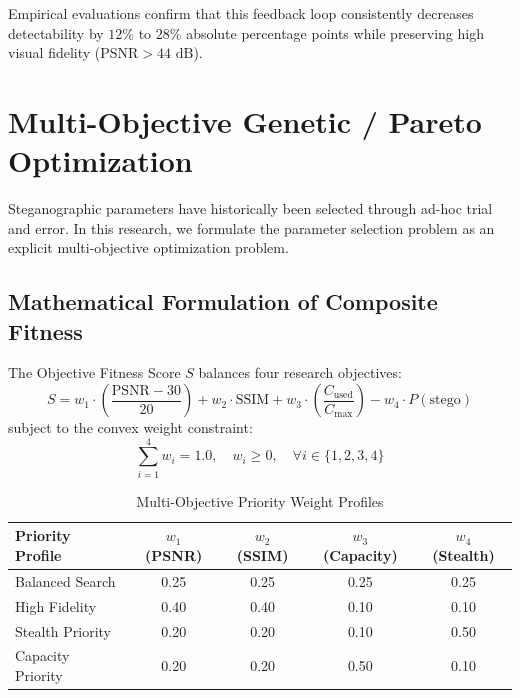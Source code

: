 \documentclass[conference]{IEEEtran}
\begin{document}
Empirical evaluations confirm that this feedback loop consistently decreases detectability by $12\%$ to $28\%$ absolute percentage points while preserving high visual fidelity ($\text{PSNR} > 44\text{ dB}$).

\section{Multi-Objective Genetic / Pareto Optimization}
Steganographic parameters have historically been selected through ad-hoc trial and error. In this research, we formulate the parameter selection problem as an explicit multi-objective optimization problem.

\subsection{Mathematical Formulation of Composite Fitness}
The Objective Fitness Score $S$ balances four research objectives:
\begin{equation}
    S = w_1 \cdot \left(\frac{\text{PSNR} - 30}{20}\right) + w_2 \cdot \text{SSIM} + w_3 \cdot \left(\frac{C_{\text{used}}}{C_{\max}}\right) - w_4 \cdot P(\text{stego})
\end{equation}
subject to the convex weight constraint:
\begin{equation}
    \sum_{i=1}^4 w_i = 1.0, \quad w_i \ge 0, \quad \forall i \in \{1, 2, 3, 4\}
\end{equation}

\begin{table}[htbp]
\caption{Multi-Objective Priority Weight Profiles}
\label{tab:weights}
\centering
\begin{tabular}{@{}lcccc@{}}
\toprule
\textbf{Priority Profile} & \textbf{$w_1$ (PSNR)} & \textbf{$w_2$ (SSIM)} & \textbf{$w_3$ (Capacity)} & \textbf{$w_4$ (Stealth)} \\
\midrule
Balanced Search    & 0.25 & 0.25 & 0.25 & 0.25 \\
High Fidelity      & 0.40 & 0.40 & 0.10 & 0.10 \\
Stealth Priority   & 0.20 & 0.20 & 0.10 & 0.50 \\
Capacity Priority  & 0.20 & 0.20 & 0.50 & 0.10 \\
\bottomrule
\end{tabular}
\end{table}
\end{document}
